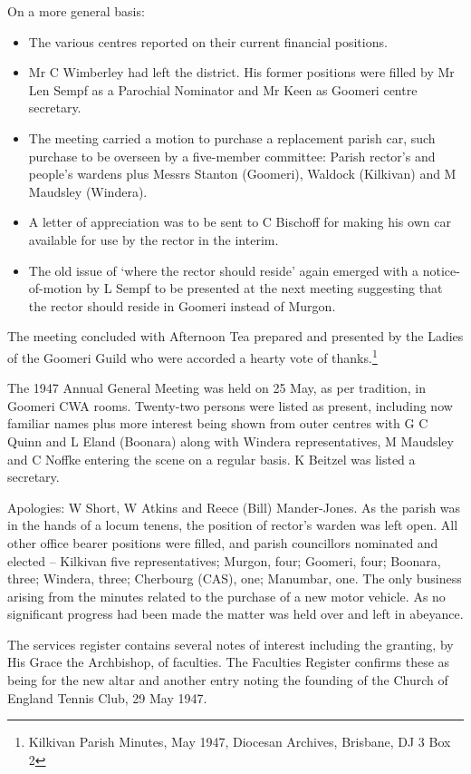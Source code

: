 On a more general basis:

\begin{itemize}
\item
  The various centres reported on their current financial positions.
\item
  Mr C Wimberley had left the district. His former positions were filled
  by Mr Len Sempf as a Parochial Nominator and Mr Keen as Goomeri centre
  secretary.
\item
  The meeting carried a motion to purchase a replacement parish car,
  such purchase to be overseen by a five-member committee: Parish
  rector's and people's wardens plus Messrs Stanton (Goomeri), Waldock
  (Kilkivan) and M Maudsley (Windera).
\item
  A letter of appreciation was to be sent to C Bischoff for making his
  own car available for use by the rector in the interim.
\item
  The old issue of `where the rector should reside' again emerged with a
  notice-of-motion by L Sempf to be presented at the next meeting
  suggesting that the rector should reside in Goomeri instead of Murgon.
\end{itemize}

The meeting concluded with Afternoon Tea prepared and presented by the
Ladies of the Goomeri Guild who were accorded a hearty vote of
thanks.\footnote{Kilkivan Parish Minutes, May 1947, Diocesan Archives,
  Brisbane, DJ 3 Box 2}

The 1947 Annual General Meeting was held on 25 May, as per tradition, in
Goomeri CWA rooms. Twenty-two persons were listed as present, including
now familiar names plus more interest being shown from outer centres
with G C Quinn and L Eland (Boonara) along with Windera representatives,
M Maudsley and C Noffke entering the scene on a regular basis. K Beitzel
was listed a secretary.

Apologies: W Short, W Atkins and Reece (Bill) Mander-Jones. As the
parish was in the hands of a locum tenens, the position of rector's
warden was left open. All other office bearer positions were filled, and
parish councillors nominated and elected -- Kilkivan five
representatives; Murgon, four; Goomeri, four; Boonara, three; Windera,
three; Cherbourg (CAS), one; Manumbar, one. The only business arising
from the minutes related to the purchase of a new motor vehicle. As no
significant progress had been made the matter was held over and left in
abeyance.

The services register contains several notes of interest including the
granting, by His Grace the Archbishop, of faculties. The Faculties
Register confirms these as being for the new altar and another entry
noting the founding of the Church of England Tennis Club, 29 May 1947.

